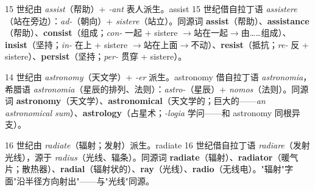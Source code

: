 \documentclass[../main.tex]{subfiles}
\begin{document}



\begin{origin}
15 世纪由 \textit{assist}（帮助）+ \textit{-ant} 表人派生。assist 15 世纪借自拉丁语 \textit{assistere}（站在旁边）：\textit{ad-}（朝向）+ \textit{sistere}（站立）。同源词 \textbf{assist}（帮助）、\textbf{assistance}（帮助）、\textbf{consist}（组成；\textit{con-} 一起 + sistere $\to$站在一起$\to$由……组成）、\textbf{insist}（坚持；\textit{in-} 在上 + sistere $\to$站在上面$\to$不动）、\textbf{resist}（抵抗；\textit{re-} 反 + sistere）、\textbf{persist}（坚持；\textit{per-} 贯穿 + sistere）。
\end{origin}



\begin{origin}
14 世纪由 \textit{astronomy}（天文学）+ \textit{-er} 派生。astronomy 借自拉丁语 \textit{astronomia}，希腊语 \textit{astronomia}（星辰的排列、法则）：\textit{astro-}（星辰）+ \textit{nomos}（法则）。同源词 \textbf{astronomy}（天文学）、\textbf{astronomical}（天文学的；巨大的——\textit{an astronomical sum}）、\textbf{astrology}（占星术；\textit{-logia} 学问——和 astronomy 同根异支）。
\end{origin}



\begin{origin}
16 世纪由 \textit{radiate}（辐射；发射）派生。radiate 16 世纪借自拉丁语 \textit{radiare}（发射光线），源于 \textit{radius}（光线、辐条）。同源词 \textbf{radiate}（辐射）、\textbf{radiator}（暖气片；散热器）、\textbf{radial}（辐射状的）、\textbf{ray}（光线）、\textbf{radio}（无线电）。"辐射"字面"沿半径方向射出"——与"光线"同源。
\end{origin}
\end{document}
